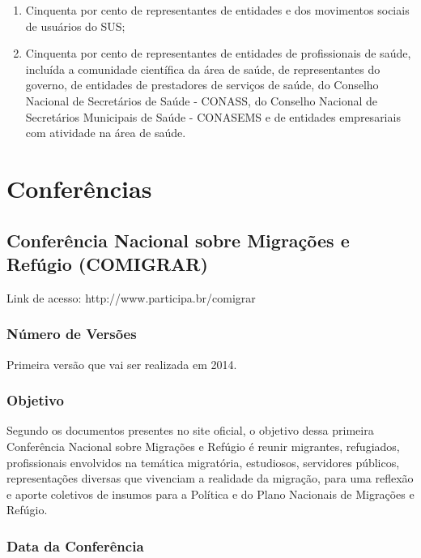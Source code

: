 \begin{enumerate}
\item Cinquenta por cento de representantes de entidades e dos movimentos
sociais de usuários do SUS; 
\item Cinquenta por cento de representantes de entidades de profissionais de
saúde, incluída a comunidade científica da área de saúde, de
representantes do governo, de entidades de prestadores de serviços
de saúde, do Conselho Nacional de Secretários de Saúde - CONASS,
do Conselho Nacional de Secretários Municipais de Saúde - CONASEMS
e de entidades empresariais com atividade na área de saúde.
\end{enumerate}

\newpage
\section*{Conferências}

\subsection*{Conferência Nacional sobre Migrações e Refúgio (COMIGRAR)}

Link de acesso: http://www.participa.br/comigrar

\subsubsection*{Número de Versões}

Primeira versão que vai ser realizada em 2014.

\subsubsection*{Objetivo}

Segundo os documentos presentes no site oficial, o objetivo dessa
primeira Conferência Nacional sobre Migrações e Refúgio é
reunir migrantes, refugiados, profissionais envolvidos na temática
migratória, estudiosos, servidores públicos, representações
diversas que vivenciam a realidade da migração, para uma
reflexão e aporte coletivos de insumos para a Política e do Plano
Nacionais de Migrações e Refúgio.


\subsubsection*{Data da Conferência}

